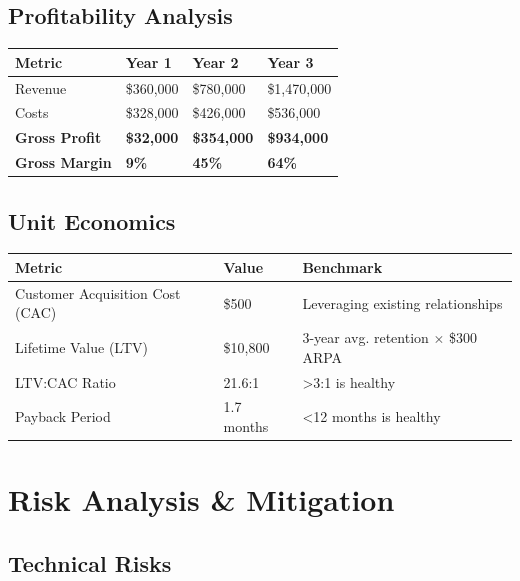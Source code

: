 \documentclass[11pt,a4paper]{article}
\begin{document}
\subsection{Profitability Analysis}

\begin{table}[H]
\centering
\begin{tabularx}{\textwidth}{@{}L{5cm}C{3.5cm}C{3.5cm}C{3.5cm}@{}}
\toprule
\textbf{Metric} & \textbf{Year 1} & \textbf{Year 2} & \textbf{Year 3} \\
\midrule
Revenue & \$360,000 & \$780,000 & \$1,470,000 \\
Costs & \$328,000 & \$426,000 & \$536,000 \\
\textbf{Gross Profit} & \textbf{\$32,000} & \textbf{\$354,000} & \textbf{\$934,000} \\
\textbf{Gross Margin} & \textbf{9\%} & \textbf{45\%} & \textbf{64\%} \\
\bottomrule
\end{tabularx}
\end{table}

\subsection{Unit Economics}

\begin{table}[H]
\centering
\begin{tabularx}{\textwidth}{@{}L{5cm}L{4.5cm}X@{}}
\toprule
\textbf{Metric} & \textbf{Value} & \textbf{Benchmark} \\
\midrule
Customer Acquisition Cost (CAC) & \$500 & Leveraging existing relationships \\
Lifetime Value (LTV) & \$10,800 & 3-year avg. retention $\times$ \$300 ARPA \\
LTV:CAC Ratio & 21.6:1 & >3:1 is healthy \\
Payback Period & 1.7 months & <12 months is healthy \\
\bottomrule
\end{tabularx}
\end{table}

\newpage
\section{Risk Analysis \& Mitigation}

\subsection{Technical Risks}
\end{document}
